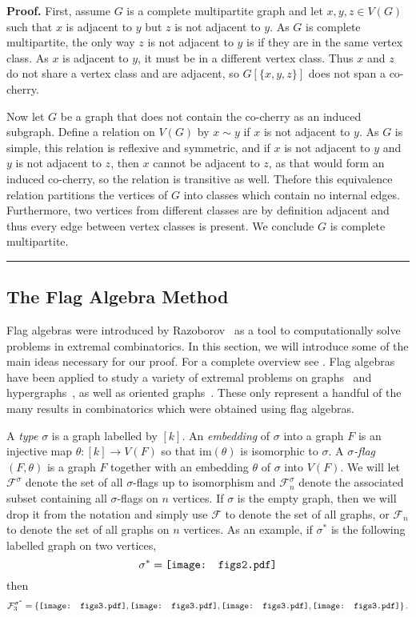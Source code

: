 \documentclass[12pt]{article}
\newcommand{\im}{\text{im}}
\renewenvironment{proof}[1][Proof]{\textbf{#1.} }{\ \rule{0.5em}{0.5em}}
\newcommand{\vc}[1]{\ensuremath{\vcenter{\hbox{#1}}}}
\newcommand{\ftwb}{\vc{\texttt{[image: figs2.pdf]}}}
\newcommand{\ftrc}{\vc{\texttt{[image: figs3.pdf]}}}
\newcommand{\ftrd}{\vc{\texttt{[image: figs3.pdf]}}}
\newcommand{\ftre}{\vc{\texttt{[image: figs3.pdf]}}}
\newcommand{\ftrf}{\vc{\texttt{[image: figs3.pdf]}}}
\begin{document}
\begin{proof}
First, assume $G$ is a complete multipartite graph and let $x,y,z \in V(G)$ such
that $x$ is adjacent to $y$ but $z$ is not adjacent to $y$. As $G$ is complete
multipartite, the only way $z$ is not adjacent to $y$ is if they are in the same
vertex class. As $x$ is adjacent to $y$, it must be in a different vertex class.
Thus $x$ and $z$ do not share a vertex class and are adjacent, so $G[\{x,y,z\}]$
does not span a co-cherry.

Now let $G$ be a graph that does not contain the co-cherry as an induced
subgraph. Define a relation on $V(G)$ by $x\sim y$ if $x$ is not
adjacent to $y$. As $G$ is simple, this relation is reflexive and symmetric, and if $x$ is
not adjacent to $y$ and $y$ is not adjacent to $z$, then $x$ cannot be adjacent
to $z$, as that would form an induced co-cherry, so the relation is transitive
as well. Thefore this equivalence relation partitions the vertices of $G$ into
classes which contain no internal edges. Furthermore, two vertices from
different classes are by definition adjacent and thus every edge between
vertex classes is present. We conclude $G$ is complete multipartite.
\end{proof}

\subsection{The Flag Algebra Method}

Flag algebras were introduced by Razoborov~\cite{Razborov} as a tool to
computationally solve problems in extremal combinatorics. In this section, we
will introduce some of the main ideas necessary for our proof. For a complete
overview see \cite{Razborov}. Flag algebras have been applied to study a
variety of extremal problems on graphs~\cite{flag-max-C5, flag-min-C5,
flag-grzesik, flag-hatami, flag-razborov-triangles} and
hypergraphs~\cite{flag-hypergraphs-Falgas-Ravry-Vaughan, flag-hyper-glebov,
flag-hyper-pikhurko}, as well as oriented graphs~\cite{flag-directed-paths,
flag-hladky-kral}. These only represent a handful of the many results in
combinatorics which were obtained using flag algebras.

A \emph{type} $\sigma$ is a graph labelled by $[k]$. An \emph{embedding} of
$\sigma$ into a graph $F$ is an injective map $\theta: [k] \to V(F)$ so that
$\im(\theta)$ is isomorphic to $\sigma$. A \emph{$\sigma$-flag} $(F,\theta)$ is a
graph $F$ together with an embedding $\theta$ of $\sigma$ into $V(F)$. We will let
$\mathcal{F}^{\sigma}$ denote the set of all $\sigma$-flags up to
isomorphism and $\mathcal{F}^{\sigma}_n$ denote the associated subset
containing all $\sigma$-flags on $n$ vertices. If $\sigma$ is the empty graph,
then we will drop it from the notation and simply use $\mathcal{F}$ to denote the set of all graphs, or $\mathcal{F}_n$ to denote the set of all graphs on $n$ vertices. As an example, if
$\sigma^*$ is the following labelled graph on two vertices,
\[ \sigma^* = \ftwb \]
then
\[ \mathcal{F}^{\sigma^*}_3 = \left\{\ftrf,\ftrc,\ftrd,\ftre \right\}. \]
\end{document}
